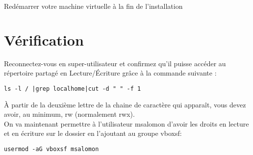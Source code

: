Redémarrer votre machine virtuelle à la fin de l'installation

\section{Vérification}

Reconnectez-vous en super-utilisateur et confirmez qu'il puisse accéder au répertoire partagé en Lecture/Écriture grâce à la commande suivante :

\begin{lstlisting}
ls -l / |grep localhome|cut -d " " -f 1
\end{lstlisting}

À partir de la deuxième lettre de la chaine de caractère qui apparaît, vous devez avoir, au minimum, rw (normalement rwx).\\

On va maintenant permettre à l'utilisateur msalomon d'avoir les droits en lecture et en écriture sur le dossier en l'ajoutant au groupe vboxsf:

\begin{lstlisting}
usermod -aG vboxsf msalomon
\end{lstlisting}
